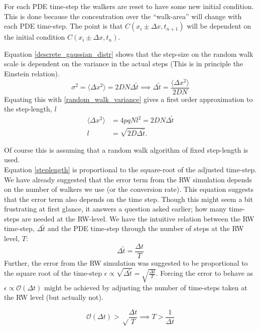 For each PDE time-step the walkers are reset to have some new initial condition. 
This is done because the concentration over the ``walk-area'' will change with each PDE time-step.
The point is that $ C(x_i\pm\Delta x,t_{n+1})$ will be dependent on the initial condition $ C(x_i\pm\Delta x,t_{n})$.


Equation \eqref{descrete_gaussian_distr} shows that the step-size on the random walk scale is dependent on the variance in the actual steps (This is in principle the Einstein relation). 
\begin{equation}
 \sigma^2 = \langle\Delta x^2\rangle = 2DN\Delta\tilde{t} \implies \Delta\tilde{t} = \frac{\langle\Delta x^2\rangle}{2DN}
\end{equation}
Equating this with \ref{random_walk_variance} gives a first order approximation to the step-length, $l$
\begin{align}
 \langle\Delta x^2\rangle &= 4pqNl^2 = 2DN\Delta\tilde{t} \nonumber \\ 
 l &= \sqrt{2D\Delta\tilde{t}}. \label{steplength}
\end{align}

Of course this is assuming that a random walk algorithm of fixed step-length is used.\\
Equation \ref{steplength} is proportional to the square-root of the adjusted time-step. 
We have already suggested that the error term from the RW simulation depends on the number of walkers we use (or the conversion rate). This equation suggests that the error term also depends on the time step. 
Though this might seem a bit frustrating at first glance, it answers a question asked earlier; how many time-steps are needed at the RW-level. 
We have the intuitive relation between the RW time-step, $\Delta \tilde t$ and the PDE time-step through the number of steps at the RW level, $T$:
\begin{equation*}
 \Delta \tilde t = \frac{\Delta t}{T}
\end{equation*}
Further, the error from the RW simulation was suggested to be proportional to the square root of the time-step $\epsilon \propto \sqrt{\Delta \tilde t} = \sqrt{\frac{\Delta t}{T}}$. 
Forcing the error to behave as $\epsilon\propto\mathcal O(\Delta t)$ might be achieved by adjusting the number of time-steps taken at the RW level (but actually not).

\begin{equation}
 \mathcal O(\Delta t)>\sqrt \frac{\Delta t}{T} \implies T>\frac{1}{\Delta t}
\end{equation}

